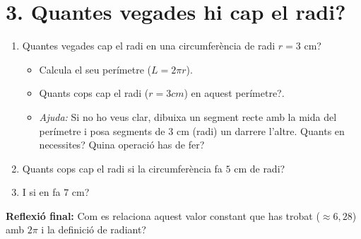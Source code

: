 \documentclass[12pt,a4paper]{article}
\begin{document}
\section*{3. Quantes vegades hi cap el radi?}
\begin{enumerate}[label=\textbf{\alph*)}]
    \item Quantes vegades cap el radi en una circumferència de radi $r = 3$ cm?
    \begin{itemize}
        \item Calcula el seu perímetre ($L = 2\pi r$).
        \item Quants cops cap el radi ($r = 3 cm$) en aquest perímetre?.
        \item \textit{Ajuda:} Si no ho veus clar, dibuixa un segment recte amb la mida del perímetre i posa segments de 3 cm (radi) un darrere l'altre. Quants en necessites? Quina operació has de fer?
    \end{itemize}
    \item Quants cops cap el radi si la circumferència fa $5$ cm de radi?
    \item I si en fa $7$ cm?
\end{enumerate}

\textbf{Reflexió final:} Com es relaciona aquest valor constant que has trobat ($\approx 6,28$) amb $2\pi$ i la definició de radiant?
\end{document}
